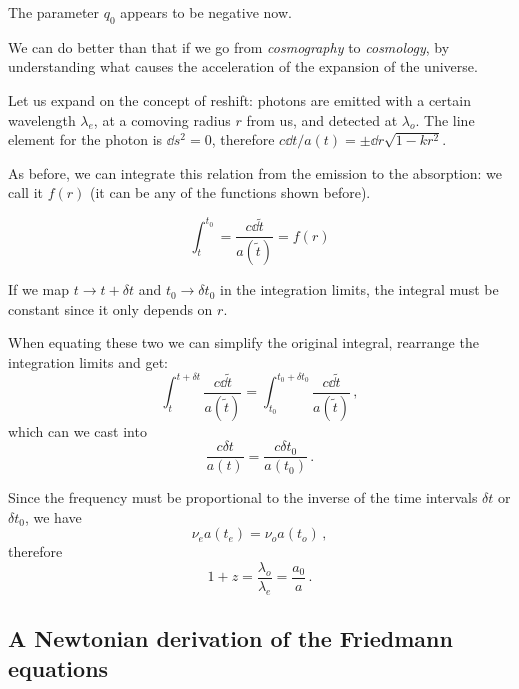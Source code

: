\documentclass[main.tex]{subfiles}
\begin{document}
The parameter \(q_0 \) appears to be negative now.

We can do better than that if we go from \emph{cosmography} to \emph{cosmology}, by understanding what causes the acceleration of the expansion of the universe.

Let us expand on the concept of reshift:
photons are emitted with a certain wavelength \(\lambda_{e}\), at a comoving radius \(r\) from us, and detected at \(\lambda_{o}\).
The line element for the photon is \(\dd{s^2} =0\), therefore \(c\dd{t}/ a(t) = \pm \dd{r} \sqrt{1-kr^2} \).

As before, we can integrate this relation from the emission to the absorption: we call it \(f(r)\) (it can be any of the functions shown before).

\begin{equation}
  \int_{t}^{t_0 } = \frac{c\dd{\widetilde{t}}}{a(\widetilde{t})} = f(r)
\end{equation}

If we map \(t \rightarrow t + \delta t\) and \(t_0 \rightarrow \delta t_0 \) in the integration limits, the integral must be constant since it only depends on \(r\).

When equating these two we can simplify the original integral, rearrange the integration limits and get:
\begin{equation}
  \int_{t}^{t + \delta t} \frac{c\dd{\widetilde{t}}}{a(\widetilde{t})} = \int_{t_0 }^{t_0 + \delta t_0 } \frac{c\dd{\widetilde{t}}}{a(\widetilde{t})}\,,
\end{equation}
%
which can we cast into
\begin{equation}
  \frac{c \delta t}{a(t)} =   \frac{c \delta t_0 }{a(t_0 )}\,.
\end{equation}

Since the frequency must be proportional to the inverse of the time intervals \(\delta t\) or \(\delta t_0 \), we have
\begin{equation}
  \nu_{e} a(t_{e}) = \nu_{o} a(t_{o})\,,
\end{equation}
%
therefore 
%
\begin{equation}
  1 + z = \frac{\lambda_{o}}{\lambda_{e}}
  = \frac{a_0 }{a}\,.
\end{equation}

\subsection{A Newtonian derivation of the Friedmann equations}
\end{document}
